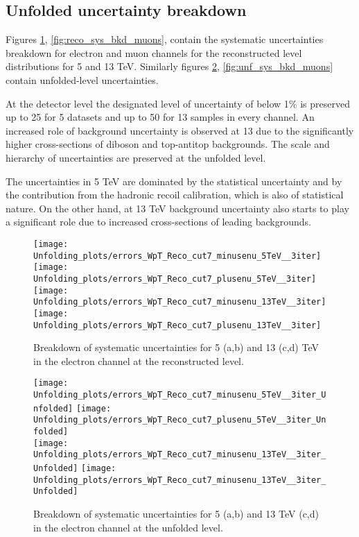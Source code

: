 \subsection{Unfolded uncertainty breakdown}
Figures \ref{fig:reco_sys_bkd_elec}, \ref{fig:reco_sys_bkd_muons}, contain the systematic uncertainties breakdown for electron and muon channels for the reconstructed level distributions for 5 and 13 TeV. Similarly figures \ref{fig:unf_sys_bkd_elec}, \ref{fig:unf_sys_bkd_muons} contain unfolded-level uncertainties. 

At the detector level the designated level of uncertainty of below 1\% is preserved up to 25 \gev{} for 5 \tev{} datasets and up to 50 \gev{} for 13 \tev{} samples in every channel. An increased role of background uncertainty is observed at 13 \tev{} due to the significantly higher cross-sections of diboson and top-antitop backgrounds. The scale and hierarchy of uncertainties are preserved at the unfolded level. 

The uncertainties in 5 TeV are dominated by the statistical uncertainty and by the contribution from the hadronic recoil calibration, which is also of statistical nature. On the other hand, at 13 TeV background uncertainty also starts to play a significant role due to increased cross-sections of leading backgrounds.

\begin{figure}[h]
	\centering
	{\texttt{[image: Unfolding\_plots/errors\_WpT\_Reco\_cut7\_minusenu\_5TeV\_\_3iter]}}
	{\texttt{[image: Unfolding\_plots/errors\_WpT\_Reco\_cut7\_plusenu\_5TeV\_\_3iter]}} \\
	{\texttt{[image: Unfolding\_plots/errors\_WpT\_Reco\_cut7\_minusenu\_13TeV\_\_3iter]}}
	{\texttt{[image: Unfolding\_plots/errors\_WpT\_Reco\_cut7\_plusenu\_13TeV\_\_3iter]}}
	
	\caption{ Breakdown of systematic uncertainties for 5 (a,b) and 13 (c,d) TeV in the electron channel at the reconstructed level.}
	\label{fig:reco_sys_bkd_elec}
\end{figure}

\begin{figure}[h]
	\centering
	{\texttt{[image: Unfolding\_plots/errors\_WpT\_Reco\_cut7\_minusenu\_5TeV\_\_3iter\_Unfolded]}}
	{\texttt{[image: Unfolding\_plots/errors\_WpT\_Reco\_cut7\_plusenu\_5TeV\_\_3iter\_Unfolded]}} \\
	{\texttt{[image: Unfolding\_plots/errors\_WpT\_Reco\_cut7\_minusenu\_13TeV\_\_3iter\_Unfolded]}}
	{\texttt{[image: Unfolding\_plots/errors\_WpT\_Reco\_cut7\_minusenu\_13TeV\_\_3iter\_Unfolded]}}
	\caption{ Breakdown of systematic uncertainties for 5 (a,b) and 13 TeV (c,d) in the electron channel at the unfolded level.}
	\label{fig:unf_sys_bkd_elec}
\end{figure}

